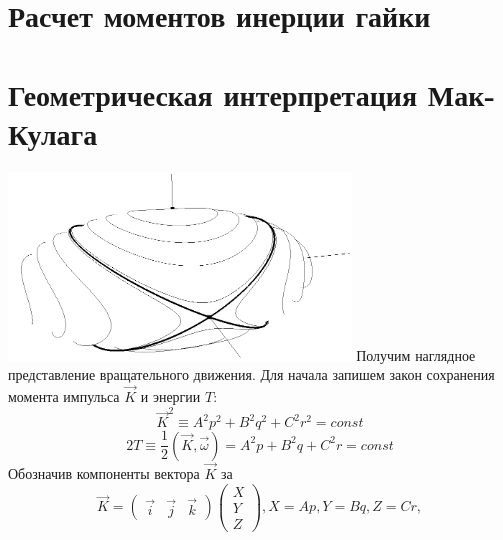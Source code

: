 \documentclass{article}
\begin{document}
\section{Расчет моментов инерции гайки}
\section{Геометрическая интерпретация Мак-Кулага}
\includegraphics[height=5cm]{ellipsoid}
\newline
Получим наглядное представление вращательного движения. Для начала запишем закон сохранения момента импульса \begin{math} \vec{K} \end{math} и энергии \begin{math} T \end{math}:
\begin{equation}
\label{angularMomentumInv}
\vec{K}^2\equiv A^2p^2+B^2q^2+C^2r^2=const
\end{equation}
\begin{equation}
\label{energyInv}
2T\equiv\frac{1}{2}\left(\vec{K},\vec{\omega}\right)=A^2p+B^2q+C^2r=const
\end{equation}
Обозначив компоненты вектора \begin{math} \vec{K} \end{math} за
\begin{equation}
\vec{K}=
\left(
\begin{array}{lcr}
\vec{i} & \vec{j} & \vec{k}
\end{array}
\right)
\left(
\begin{array}{lcr}
X\\
Y\\
Z
\end{array}
\right),
X=Ap,Y=Bq,Z=Cr,
\end{equation}
\end{document}
